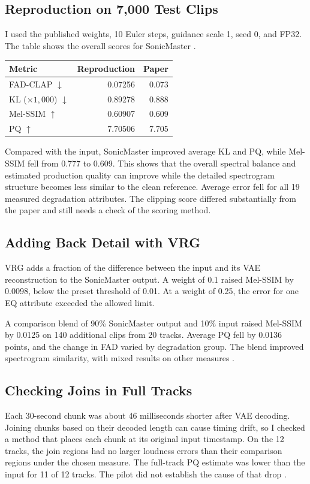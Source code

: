 \documentclass[12pt,a4paper]{article}
\begin{document}
\subsection{Reproduction on 7,000 Test Clips}
I used the published weights, 10 Euler steps, guidance scale 1, seed 0, and FP32. The table shows the overall scores for SonicMaster \cite{reproduce}.

\begin{center}
\begin{tabular}{lrr}
\toprule
Metric & Reproduction & Paper \\
\midrule
FAD-CLAP $\downarrow$ & 0.07256 & 0.073 \\
KL ($\times 1{,}000$) $\downarrow$ & 0.89278 & 0.888 \\
Mel-SSIM $\uparrow$ & 0.60907 & 0.609 \\
PQ $\uparrow$ & 7.70506 & 7.705 \\
\bottomrule
\end{tabular}
\end{center}

Compared with the input, SonicMaster improved average KL and PQ, while Mel-SSIM fell from 0.777 to 0.609. This shows that the overall spectral balance and estimated production quality can improve while the detailed spectrogram structure becomes less similar to the clean reference. Average error fell for all 19 measured degradation attributes. The clipping score differed substantially from the paper and still needs a check of the scoring method.

\subsection{Adding Back Detail with VRG}
VRG adds a fraction of the difference between the input and its VAE reconstruction to the SonicMaster output. A weight of 0.1 raised Mel-SSIM by 0.0098, below the preset threshold of 0.01. At a weight of 0.25, the error for one EQ attribute exceeded the allowed limit.

A comparison blend of 90\% SonicMaster output and 10\% input raised Mel-SSIM by 0.0125 on 140 additional clips from 20 tracks. Average PQ fell by 0.0136 points, and the change in FAD varied by degradation group. The blend improved spectrogram similarity, with mixed results on other measures \cite{pilots}.

\subsection{Checking Joins in Full Tracks}
Each 30-second chunk was about 46 milliseconds shorter after VAE decoding. Joining chunks based on their decoded length can cause timing drift, so I checked a method that places each chunk at its original input timestamp. On the 12 tracks, the join regions had no larger loudness errors than their comparison regions under the chosen measure. The full-track PQ estimate was lower than the input for 11 of 12 tracks. The pilot did not establish the cause of that drop \cite{pilots}.
\end{document}
